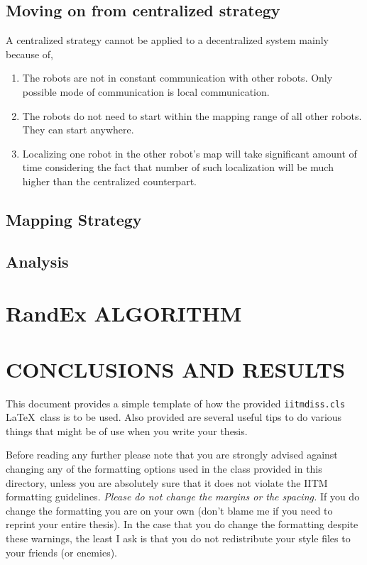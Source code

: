 \documentclass[MTech]{iitmdiss}
\begin{document}
\section{Moving on from centralized strategy}
A centralized strategy cannot be applied to a decentralized system mainly because of,
\begin{enumerate}
    \item The robots are not in constant communication with other robots. Only possible mode of communication is local communication.
    \item The robots do not need to start within the mapping range of all other robots. They can start anywhere.
    \item Localizing one robot in the other robot's map will take significant amount of time considering the fact that number of such localization will be much higher than the centralized counterpart.
\end{enumerate}

\section{Mapping Strategy}
\section{Analysis}

\chapter{RandEx ALGORITHM}
\chapter{CONCLUSIONS AND RESULTS}
\label{chap:intro}

This document provides a simple template of how the provided
\verb+iitmdiss.cls+ \LaTeX\ class is to be used.  Also provided are
several useful tips to do various things that might be of use when you
write your thesis.

Before reading any further please note that you are strongly advised
against changing any of the formatting options used in the class
provided in this directory, unless you are absolutely sure that it
does not violate the IITM formatting guidelines.  \emph{Please do not
  change the margins or the spacing.}  If you do change the formatting
you are on your own (don't blame me if you need to reprint your entire
thesis).  In the case that you do change the formatting despite these
warnings, the least I ask is that you do not redistribute your style
files to your friends (or enemies).
\end{document}
